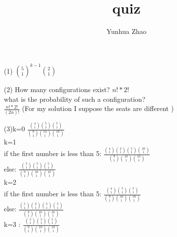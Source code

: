 \documentclass{report}
\author{Yunhua Zhao}
\title{quiz}
\begin{document}
\maketitle
(1) ${5 \choose 1}^{k-1}{2 \choose 1}$

(2) How many configurations exist?  $n!*2!$ \\
 what is the probability of such a configuration? \\
  $\frac{n!*2!}{(2n)!}$  (For my solution I suppose the seats are different )

(3)k=0 $ \frac{{4 \choose 1}{5 \choose 1}{5 \choose 1}}{{9 \choose 1}{10 \choose 1}{10 \choose 1}} $ \\
k=1 \\
if the first number is less than 5: $\frac{{4 \choose 1}{2 \choose 1}{5 \choose 1}{10 \choose 1}}{{9 \choose 1}{10 \choose 1}{10 \choose 1}}$  \\
else: $\frac{{5 \choose 1}{5 \choose 1}{5 \choose 1}}{{9 \choose 1}{10 \choose 1}{10 \choose 1}}$ \\
k=2 \\
if the first number is less than 5: $\frac{{4 \choose 1}{5 \choose 1}{5 \choose 1}}{{9 \choose 1}{10 \choose 1}{10 \choose 1}}$  \\
else: $\frac{{5 \choose 1}{2 \choose 1}{5 \choose 1}{5 \choose 1}}{{9 \choose 1}{10 \choose 1}{10 \choose 1}}$ \\
k=3 : $\frac{{5 \choose 1}{5 \choose 1}{5 \choose 1}}{{9 \choose 1}{10 \choose 1}{10 \choose 1}}$
\end{document}
